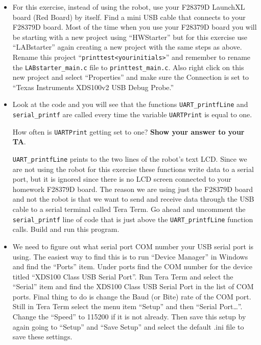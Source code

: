 \documentclass[11pt]{article}
\begin{document}
\begin{itemize}
    \item For this exercise, instead of using the robot, use your F28379D LaunchXL board (Red Board) by itself. Find a mini USB cable that connects to your F28379D board. Most of the time when you use your F28379D board you will be starting with a new project using “HWStarter” but for this exercise use “LABstarter” again creating a new project with the same steps as above. Rename this project “\lstinline|printtest<yourinitials>|” and remember to rename the \lstinline|LABstarter_main.c| file to \lstinline|printtest_main.c|. Also right click on this new project and select “Properties” and make sure the Connection is set to “Texas Instruments XDS100v2 USB Debug Probe.”
        \item Look at the code and you will see that the functions \texttt{UART_printfLine} and \texttt{serial_printf} are called every time the variable \texttt{UARTPrint} is equal to one.
        \begin{checkoff}
                How often is \texttt{UARTPrint} getting set to one? \textbf{Show your answer to your TA}.
        \end{checkoff}
        \texttt{UART_printfLine} prints to the two lines of the robot’s text LCD. Since we are not using the robot for this exercise these functions write data to a serial port, but it is ignored since there is no LCD screen connected to your homework F28379D board. The reason we are using just the F28379D board and not the robot is that we want to send and receive data through the USB cable to a serial terminal called Tera Term. Go ahead and uncomment the \texttt{serial_printf} line of code that is just above the \texttt{UART_printfLine} function calls. Build and run this program.
    \item We need to figure out what serial port COM number your USB serial port is using. The easiest way to find this is to run “Device Manager” in Windows and find the “Ports” item. Under ports find the COM number for the device titled “XDS100 Class USB Serial Port”. Run Tera Term and select the “Serial” item and find the XDS100 Class USB Serial Port in the list of COM ports. Final thing to do is change the Baud (or Bite) rate of the COM port. Still in Tera Term select the menu item “Setup” and then “Serial Port…”. Change the “Speed” to 115200 if it is not already. Then save this setup by again going to “Setup” and “Save Setup” and select the default .ini file to save these settings.

\end{itemize}
\end{document}

